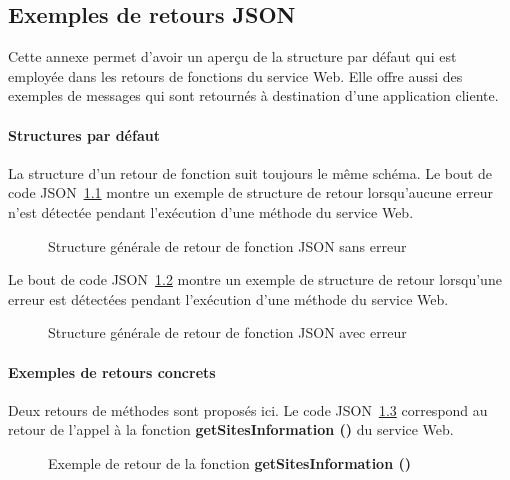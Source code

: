 \begin{appendices}
\chapter{Exemples de retours JSON}
\label{chapterAnnexe:exempleJSON}

Cette annexe permet d'avoir un aper\c{c}u de la structure par d\'efaut qui est employ\'ee dans les retours de fonctions du service Web.
Elle offre aussi des exemples de messages qui sont retourn\'es \`a destination d'une application cliente.

\subsubsection{Structures par d\'efaut}

La structure d'un retour de fonction suit toujours le m\^eme sch\'ema.
Le bout de code JSON~\ref{annexe:structureSansErreurJSON} montre un exemple de structure de retour lorsqu'aucune erreur n'est d\'etect\'ee pendant l'ex\'ecution d'une m\'ethode du service Web.

\begin{figure}[!ht]
	\centering
	
	\caption{Structure g\'en\'erale de retour de fonction JSON sans erreur}
	\label{annexe:structureSansErreurJSON}

\end{figure}

Le bout de code JSON~\ref{annexe:structureAvecErreurJSON} montre un exemple de structure de retour lorsqu'une erreur est d\'etect\'ees pendant l'ex\'ecution d'une m\'ethode du service Web.

\begin{figure}[!ht]
	\centering
	
	\caption{Structure g\'en\'erale de retour de fonction JSON avec erreur}
	\label{annexe:structureAvecErreurJSON}

\end{figure}

\subsubsection{Exemples de retours concrets}

Deux retours de m\'ethodes sont propos\'es ici.
Le code JSON~\ref{annexe:getsitesinformation} correspond au retour de l'appel \`a la fonction \textbf{getSitesInformation ()} du service Web.

\begin{figure}[!ht]
	\centering
	
	\caption{Exemple de retour de la fonction \textbf{getSitesInformation ()}}
	\label{annexe:getsitesinformation}


\end{figure}
\end{appendices}
